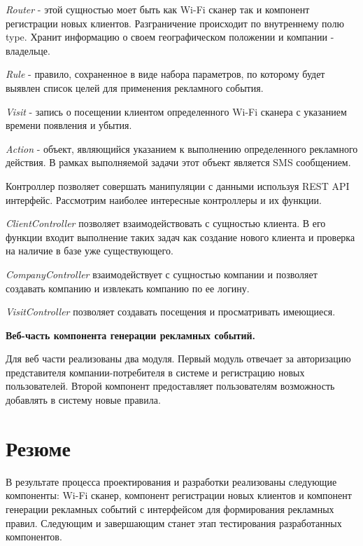 \textit{Router} - этой сущностью моет быть как Wi-Fi сканер так и компонент регистрации новых клиентов. Разграничение происходит по внутреннему полю type. Хранит информацию о своем географическом положении и компании - владельце.

\textit{Rule} - правило, сохраненное в виде набора параметров, по которому будет выявлен список целей для применения рекламного события. 

\textit{Visit} - запись о посещении клиентом определенного Wi-Fi сканера с указанием времени появления и убытия.

\textit{Action} - объект, являющийся указанием к выполнению определенного рекламного действия. В рамках выполняемой задачи этот объект является SMS сообщением. 

Контроллер позволяет совершать манипуляции с данными используя REST API интерфейс. Рассмотрим наиболее интересные контроллеры и их функции.

 \textit{ClientController} позволяет взаимодействовать с сущностью клиента. В его функции входит выполнение таких задач как создание нового клиента и проверка на наличие в базе уже существующего.

 \textit{CompanyController} взаимодействует с сущностью компании и позволяет создавать компанию и извлекать компанию по ее логину.

 \textit{VisitController} позволяет создавать посещения и просматривать имеющиеся. 

\textbf{Веб-часть компонента генерации рекламных событий.}

Для веб части реализованы два модуля. Первый модуль отвечает за авторизацию представителя компании-потребителя в системе и регистрацию новых пользователей. Второй компонент предоставляет пользователям возможность добавлять в систему новые правила.

\section{Резюме}

В результате процесса проектирования и разработки реализованы следующие компоненты: Wi-Fi сканер, компонент регистрации новых клиентов и компонент генерации рекламных событий с интерфейсом для формирования рекламных правил. Следующим и завершающим станет этап тестирования разработанных компонентов.